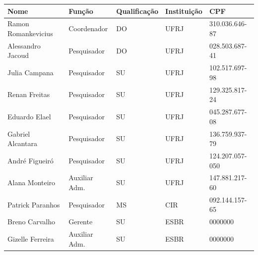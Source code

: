 \begin{onecolumn}
\thispagestyle{empty}


\begin{center}

  
 \vfill



  
  \vspace{0.50cm}



  \begin{center}
    \begin{tabular}{| l | l | l | l | l |}
    
    \hline
   	 Nome 					& Função			 & Qualificação 	& Instituição	 & CPF \\ \hline
   	 Ramon Romankevicius 		& Coordenador 	& DO			 & UFRJ 		& 310.036.646-87\\			\hline
   	Alessandro Jacoud 			& Pesquisador 		& DO 			& UFRJ 	& 028.503.687-41\\ 			\hline
   	Julia Campana 			& Pesquisador		 & SU 			& UFRJ 	& 102.517.697-98\\ 			\hline
   	Renan Freitas 				& Pesquisador 		& SU 			& UFRJ 	& 129.325.817-24\\ 		
   	\hline Eduardo Elael 				& Pesquisador 		& SU 			& UFRJ	 & 045.287.677-08\\ 			\hline
  	Gabriel Alcantara 			& Pesquisador 		& SU 			& UFRJ 	& 136.759.937-79\\ 		
  	\hline André Figueiró 			& Pesquisador 		& SU 			& UFRJ 	& 124.207.057-050\\ 			\hline
   	Alana Monteiro 			 & Auxiliar Adm.	 & SU 			& UFRJ 	& 147.881.217-60\\ 		
   	\hline Patrick  Paranhos 			& Pesquisador 		& MS 			& CIR 	& 092.144.157-65\\ \hline
	Breno Carvalho				 & Gerente 		& SU 			& ESBR 	& 0000000\\ 	
\hline
	Gizelle Ferreira 			& Auxiliar Adm. 	& SU 			& ESBR 	& 0000000\\ 
\hline

    
    \hline 
    \end{tabular}
\end{center}

\end{center}
\end{onecolumn}

\newpage

\hypersetup{pageanchor=true}

